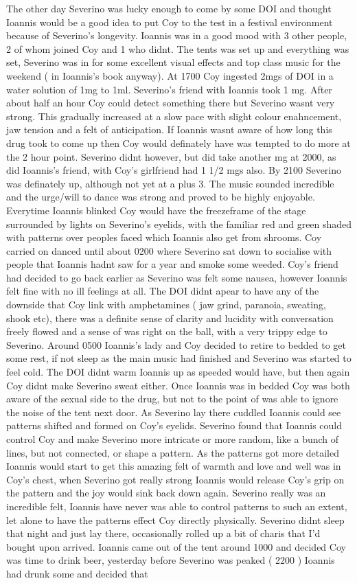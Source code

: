 \documentclass[12pt]{book}
\begin{document}
The other day Severino was lucky enough to come by some DOI and thought Ioannis would be a good idea to put Coy to the test in a festival environment because of Severino's longevity. Ioannis was in a good mood with 3 other people, 2 of whom joined Coy and 1 who didnt. The tents was set up and everything was set, Severino was in for some excellent visual effects and top class music for the weekend ( in Ioannis's book anyway). At 1700 Coy ingested 2mgs of DOI in a water solution of 1mg to 1ml. Severino's friend with Ioannis took 1 mg. After about half an hour Coy could detect something there but Severino wasnt very strong. This gradually increased at a slow pace with slight colour enahncement, jaw tension and a felt of anticipation. If Ioannis wasnt aware of how long this drug took to come up then Coy would definately have was tempted to do more at the 2 hour point. Severino didnt however, but did take another mg at 2000, as did Ioannis's friend, with Coy's girlfriend had 1 1/2 mgs also. By 2100 Severino was definately up, although not yet at a plus 3. The music sounded incredible and the urge/will to dance was strong and proved to be highly enjoyable. Everytime Ioannis blinked Coy would have the freezeframe of the stage surrounded by lights on Severino's eyelids, with the familiar red and green shaded with patterns over peoples faced which Ioannis also get from shrooms. Coy carried on danced until about 0200 where Severino sat down to socialise with people that Ioannis hadnt saw for a year and smoke some weeded. Coy's friend had decided to go back earlier as Severino was felt some nausea, however Ioannis felt fine with no ill feelings at all. The DOI didnt apear to have any of the downside that Coy link with amphetamines ( jaw grind, paranoia, sweating, shook etc), there was a definite sense of clarity and lucidity with conversation freely flowed and a sense of was right on the ball, with a very trippy edge to Severino. Around 0500 Ioannis's lady and Coy decided to retire to bedded to get some rest, if not sleep as the main music had finished and Severino was started to feel cold. The DOI didnt warm Ioannis up as speeded would have, but then again Coy didnt make Severino sweat either. Once Ioannis was in bedded Coy was both aware of the sexual side to the drug, but not to the point of was able to ignore the noise of the tent next door. As Severino lay there cuddled Ioannis could see patterns shifted and formed on Coy's eyelids. Severino found that Ioannis could control Coy and make Severino more intricate or more random, like a bunch of lines, but not connected, or shape a pattern. As the patterns got more detailed Ioannis would start to get this amazing felt of warmth and love and well was in Coy's chest, when Severino got really strong Ioannis would release Coy's grip on the pattern and the joy would sink back down again. Severino really was an incredible felt, Ioannis have never was able to control patterns to such an extent, let alone to have the patterns effect Coy directly physically. Severino didnt sleep that night and just lay there, occasionally rolled up a bit of charis that I'd bought upon arrived. Ioannis came out of the tent around 1000 and decided Coy was time to drink beer, yesterday before Severino was peaked ( 2200 ) Ioannis had drunk some and decided that 
\end{document}
